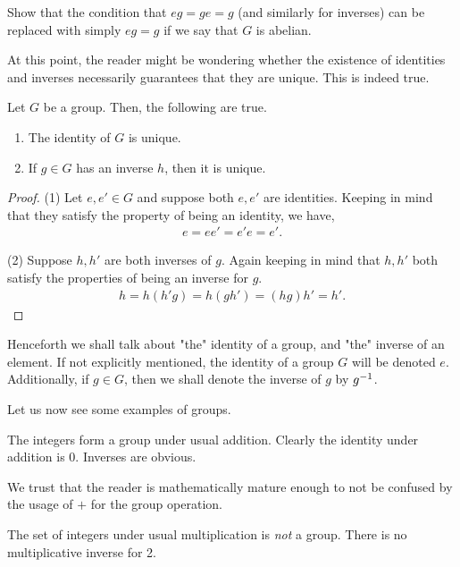 \documentclass[./algebra-notes.tex]{subfiles}
\begin{document}
\begin{exercise}
    Show that the condition that $eg=ge=g$ (and similarly for inverses) can be
    replaced with simply $eg=g$ if we say that $G$ is abelian.
\end{exercise}

At this point, the reader might be wondering whether the existence of identities
and inverses necessarily guarantees that they are unique. This is indeed true.
\begin{theorem}
\label{thm:group-identity-inverses-unique}
    Let $G$ be a group. Then, the following are true. 
    \begin{enumerate}
        \item The identity of $G$ is unique. 
        \item If $g \in G$ has an inverse $h$, then it is unique.
    \end{enumerate}
\end{theorem}
\begin{proof}
    (1) Let $e, e' \in G$ and suppose both $e, e'$ are identities. Keeping in
    mind that they satisfy the property of being an identity, we have, 
    \begin{align*}
        e = ee' = e'e = e'.
    \end{align*}

    (2) Suppose $h, h'$ are both inverses of $g$. Again keeping in mind that $h,
    h'$ both satisfy the properties of being an inverse for $g$.
    \begin{align*}
        h = h(h'g) = h(gh') = (hg)h' = h'.
    \end{align*}
\end{proof}
Henceforth we shall talk about "the" identity of a group, and "the" inverse of
an element. If not explicitly mentioned, the identity of a group $G$ will be
denoted $e$. Additionally, if $g \in G$, then we shall denote the inverse of $g$
by $g^{-1}$. 

Let us now see some examples of groups.
\begin{example}[Integers]
    The integers form a group under usual addition. Clearly the identity under
    addition is $0$. Inverses are obvious.
\end{example}
We trust that the reader is mathematically mature enough to not be confused by
the usage of $+$ for the group operation.

\begin{example}
    The set of integers under usual multiplication is \emph{not} a group. There is no
    multiplicative inverse for 2.
\end{example}
\end{document}
